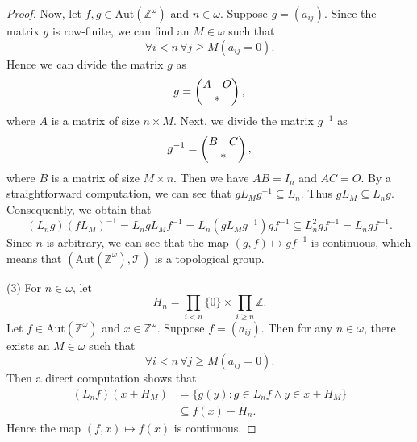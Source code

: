\documentclass[10pt,a4paper]{amsart}
\def\Z {{\mathbb{Z}}}
\def\aut{{\mathrm{Aut}}}
\begin{document}
\begin{proof}
    Now, let $f,g\in\aut(\Z^\omega)$ and $n\in\omega$. Suppose $g=(a_{ij})$. Since the matrix $g$ is row-finite, we can find an $M\in\omega$ such that
    $$\forall i<n\,\forall j\geq M\left(a_{ij}=0\right).$$
    Hence we can divide the matrix $g$ as
    \begin{equation*}
        g=\begin{pmatrix}
            A & O\\
            \multicolumn{2}{c}{*}
        \end{pmatrix},
    \end{equation*}
    where $A$ is a matrix of size $n\times M$. Next, we divide the matrix $g^{-1}$ as
    \begin{equation*}
        g^{-1}=\begin{pmatrix}
            B & C\\
            \multicolumn{2}{c}{*}
        \end{pmatrix},
    \end{equation*}
    where $B$ is a matrix of size $M\times n$. Then we have $AB=I_n$ and $AC=O$. By a straightforward computation, we can see that $gL_Mg^{-1}\subseteq L_n$. Thus $gL_M\subseteq L_ng$. Consequently, we obtain that
    $$(L_ng)(fL_M)^{-1}=L_ngL_Mf^{-1}=L_n(gL_Mg^{-1})gf^{-1}\subseteq L_n^2gf^{-1}=L_ngf^{-1}.$$
    Since $n$ is arbitrary, we can see that the map $(g,f)\mapsto gf^{-1}$ is continuous, which means that $(\aut(\Z^\omega),\mathcal{T})$ is a topological group.

    (3) For $n\in\omega$, let
    $$H_n=\prod_{i<n}\{0\}\times\prod_{i\geq n}\Z.$$
    Let $f\in\aut(\Z^\omega)$ and $x\in\Z^\omega$. Suppose $f=(a_{ij})$. Then for any $n\in\omega$, there exists an $M\in\omega$ such that
    $$\forall i< n\,\forall j\geq M\left(a_{ij}=0\right).$$
    Then a direct computation shows that
    \begin{align*}
        (L_nf)(x+H_M)&=\{g(y):g\in L_nf\land y\in x+H_M\}\\
        &\subseteq f(x)+H_n.
    \end{align*}
    Hence the map $(f,x)\mapsto f(x)$ is continuous.
\end{proof}
\end{document}
